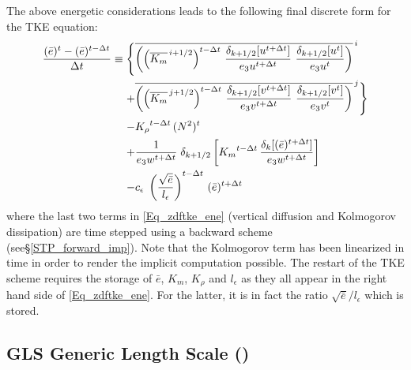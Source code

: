 \documentclass[NEMO_book]{subfiles}
\begin{document}
The above energetic considerations leads to 
the following final discrete form for the TKE equation:
\begin{equation} \label{Eq_zdftke_ene}
\begin{split}
\frac { (\bar{e})^t - (\bar{e})^{t-\rdt} } {\rdt}  \equiv  
\Biggl\{ \Biggr.
  &\overline{ \left( \left(\overline{K_m}^{\,i+1/2}\right)^{t-\rdt} \,\frac{\delta_{k+1/2}[u^{t+\rdt}]}{{e_3u}^{t+\rdt} } 
                                                                              \ \frac{\delta_{k+1/2}[u^ t         ]}{{e_3u}^ t          }  \right) }^{\,i} \\
+&\overline{  \left( \left(\overline{K_m}^{\,j+1/2}\right)^{t-\rdt} \,\frac{\delta_{k+1/2}[v^{t+\rdt}]}{{e_3v}^{t+\rdt} } 
                                                                               \ \frac{\delta_{k+1/2}[v^ t         ]}{{e_3v}^ t          }  \right) }^{\,j} 
\Biggr. \Biggr\}   \\
%
- &{K_\rho}^{t-\rdt}\,{(N^2)^t}    \\
%
+&\frac{1}{{e_3w}^{t+\rdt}}  \;\delta_{k+1/2} \left[   {K_m}^{t-\rdt} \,\frac{\delta_{k}[(\bar{e})^{t+\rdt}]} {{e_3w}^{t+\rdt}}   \right]   \\
%
- &c_\epsilon \; \left( \frac{\sqrt{\bar {e}}}{l_\epsilon}\right)^{t-\rdt}\,(\bar {e})^{t+\rdt}
\end{split}
\end{equation}
where the last two terms in \eqref{Eq_zdftke_ene} (vertical diffusion and Kolmogorov dissipation) 
are time stepped using a backward scheme (see\S\ref{STP_forward_imp}). 
Note that the Kolmogorov term has been linearized in time in order to render 
the implicit computation possible. The restart of the TKE scheme 
requires the storage of $\bar {e}$, $K_m$, $K_\rho$ and $l_\epsilon$ as they all appear in 
the right hand side of \eqref{Eq_zdftke_ene}. For the latter, it is in fact 
the ratio $\sqrt{\bar{e}}/l_\epsilon$ which is stored. 

\subsection{GLS Generic Length Scale ()}
\label{ZDF_gls}

\end{document}
